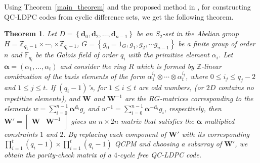 \documentclass[journal,draftclsnofoot,onecolumn,12pt,twoside]{IEEEtran}
\newtheorem{theorem}{Theorem}
\begin{document}
Using Theorem~\ref{main_theorem} and the proposed method in \cite{15}, for constructing QC-LDPC codes from cyclic difference sets, we get the following theorem.
\begin{theorem}\label{main_theorem2}
Let $D=\left\lbrace \mathbf{d}_0,\mathbf{d}_2,\ldots,\mathbf{d}_{n-1} \right\rbrace$ be an $S_2$-set in the  Abelian group $H=\mathbb{Z}_{q_1-1}\times \cdots, \times \mathbb{Z}_{q_t-1}$, $G=\left\{g_0=1_G,g_1,g_2,\cdots g_{n-1}\right\}$ be a finite group of order $n$ and $\mathbb{F}_{q_i}$ be the Galois field of order $q_i$  with the primitive element $\alpha_i$. Let $\boldsymbol{\alpha}=(\alpha_1,\ldots, \alpha_t)$ and consider the ring $R$ which is formed by $\mathbb{Z}$-linear combination of the basis elements of the form $\alpha_1^{i_1}\otimes \cdots \otimes \alpha_t^{i_t}$, where $0\leq i_j\leq q_j-2$ and $1\leq j\leq t$. If $(q_i-1)$'s, for  $1\leq i\leq t$ are odd numbers, (or $2D$ contains no repetitive elements), and $\mathbf{W}$ and $\mathbf{W}^{-1}$  are the $RG$-matrices corresponding to the elements $w=\sum_{i=0}^{n-1}\boldsymbol{\alpha}^{\mathbf{d}_i}g_i$ and $w^{-1}=\sum_{i=0}^{n-1}\boldsymbol{\alpha}^{-\mathbf{d}_i}g_i$, respectively, then $\mathbf{W}'=\left[
                                             \begin{array}{c|c}
                                               \mathbf{W} & \mathbf{W}^{-1}  \\
                                             \end{array}
                                           \right]$
gives an $n\times 2n$ matrix  that satisfies  the $\boldsymbol{\alpha}$-multiplied constraints $1$ and $2$. By replacing each component of $\mathbf{W}'$ with its corresponding $\prod_{i=1}^t(q_i-1)\times\prod_{i=1}^t(q_i-1)$ QCPM and choosing a subarray of $\mathbf{W}'$,   we obtain  the parity-check matrix of a $4$-cycle free QC-LDPC code.
\end{theorem}
\end{document}
